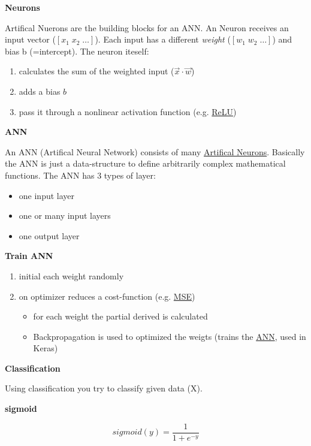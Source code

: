 \documentclass[11pt,landscape]{article}
\begin{document}
\begin{multicols}{3}
\textbf{Neurons}

Artifical Nuerons are the building blocks for an ANN.
An Neuron receives an input vector (\([x_1 \; x_2 \; \ldots]\)).
Each input has a different \emph{weight} (\([w_1 \; w_2 \; \ldots]\)) and bias b (=intercept).
The neuron iteself:
\begin{enumerate}
\item calculates the sum of the weighted input (\(\vec{x} \cdot \vec{w}\))
\item adds a bias \(b\)
\item pass it through a nonlinear activation function (e.g. \href{../../../roam/20211214121924-relu.org}{ReLU})
\end{enumerate}


\textbf{ANN}

An ANN (Artifical Neural Network) consists of many \href{../../../roam/20211214121841-artifical_neurons.org}{Artifical Neurons}.
Basically the ANN is just a data-structure to define arbitrarily complex mathematical functions.
The ANN has 3 types of layer:
\begin{itemize}
\item one input layer
\item one or many input layers
\item one output layer
\end{itemize}


\textbf{Train ANN}

\begin{enumerate}
\item initial each weight randomly
\item on optimizer reduces a cost-function (e.g. \href{../../../roam/20211004175550-mean_squared_error.org}{MSE})
\begin{itemize}
\item for each weight the partial derived is calculated
\item Backpropagation is used to optimized the weigts (trains the \href{../../../roam/20211214110732-ann.org}{ANN}, used in Keras)
\end{itemize}
\end{enumerate}

\textbf{Classification}

Using classification you try to classify given data (X).

\textbf{sigmoid}

\begin{equation}
  sigmoid(y) = \frac{1}{1 + e^{-y}}
\end{equation}


\end{multicols}
\end{document}
